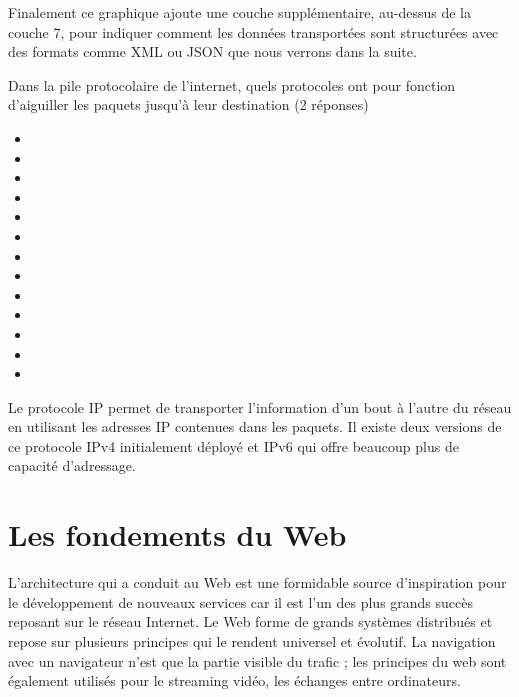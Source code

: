   Finalement ce graphique ajoute une couche supplémentaire, au-dessus de la couche 7, pour indiquer comment les données transportées sont structurées avec des formats comme \ac{XML} ou \ac{JSON} que nous verrons dans la suite.
  
  
  {Dans la pile protocolaire de l'internet, quels protocoles ont pour fonction d'aiguiller les paquets jusqu'à leur destination (2 réponses) 
  \begin{multicols}{4}
  \begin{itemize}[label=$\square$]
   \item {}
   \item {}
   \item {}
   \item {}
   \item {}
   \item {}
   \item {}
   \item {}
   \item {} 
   \item {}
   \item {}
   \item {}
   \item {}
  \end{itemize}
  \end{multicols}
  }
  {Le protocole \ac{IP} permet de transporter l'information d'un bout à l'autre du réseau en utilisant les adresses \ac{IP} contenues dans les paquets. Il existe deux versions de ce protocole \ac{IPv4} initialement déployé et \ac{IPv6} qui offre beaucoup plus de capacité d'adressage.}
  
  \section{Les fondements du Web}
  
    \vspace{1em}
\begin{figure}
\end{figure}

  L'architecture qui a conduit au Web est une formidable source d’inspiration pour le développement de nouveaux services car il est l’un des plus grands succès reposant sur le réseau Internet. Le Web forme de grands systèmes distribués et repose sur plusieurs principes qui le rendent universel et évolutif. La navigation avec un navigateur n’est que la partie visible du trafic ; les principes du web sont également utilisés pour le streaming vidéo, les échanges entre ordinateurs. 
  
